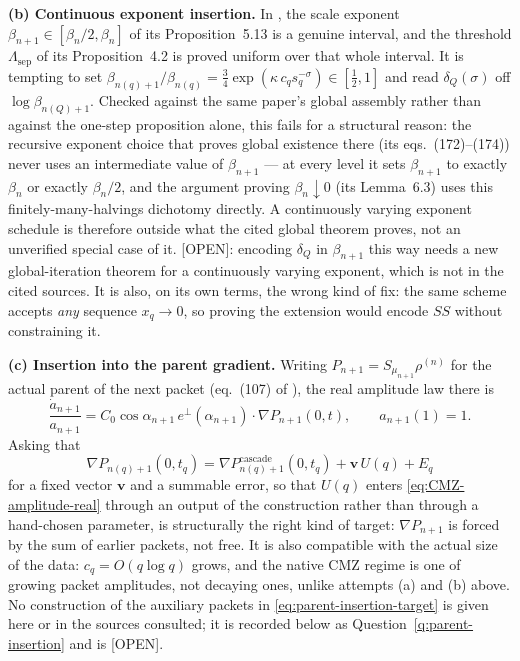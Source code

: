 \documentclass[11pt]{amsart}
\numberwithin{equation}{section}
\theoremstyle{plain}
\theoremstyle{definition}
\theoremstyle{remark}
\begin{document}
\textbf{(b) Continuous exponent insertion.}  In
\cite{AlpogeBuckmasterCoiculescu2026}, the scale exponent
$\beta_{n+1}\in[\beta_n/2,\beta_n]$ of its Proposition~5.13 is a genuine
interval, and the threshold $\Lambda_{\mathrm{sep}}$ of its Proposition~4.2
is proved uniform over that whole interval.  It is tempting to set
$\beta_{n(q)+1}/\beta_{n(q)}=\tfrac34\exp(\kappa\, c_qs_q^{-\sigma})\in[\tfrac12,1]$
and read $\delta_Q(\sigma)$ off $\log\beta_{n(Q)+1}$.  Checked against the
same paper's global assembly rather than against the one-step proposition
alone, this fails for a structural reason: the recursive exponent choice
that proves global existence there (its eqs.~(172)--(174)) never uses an
intermediate value of $\beta_{n+1}$ --- at every level it sets $\beta_{n+1}$
to exactly $\beta_n$ or exactly $\beta_n/2$, and the argument proving
$\beta_n\downarrow0$ (its Lemma~6.3) uses this finitely-many-halvings
dichotomy directly.  A continuously varying exponent schedule is therefore
outside what the cited global theorem proves, not an unverified special case
of it.  \textup{[OPEN]}: encoding $\delta_Q$ in $\beta_{n+1}$ this way needs
a new global-iteration theorem for a continuously varying exponent, which is
not in the cited sources.  It is also, on its own terms, the wrong kind of
fix: the same scheme accepts \emph{any} sequence $x_q\to0$, so proving the
extension would encode $SS$ without constraining it.

\textbf{(c) Insertion into the parent gradient.}  Writing
$P_{n+1}=S_{\mu_{n+1}}\rho^{(n)}$ for the actual parent of the next packet
(eq.~(107) of \cite{AlpogeBuckmasterCoiculescu2026}), the real amplitude law
there is
\begin{equation}
\frac{\dot a_{n+1}}{a_{n+1}}
=C_0\cos\alpha_{n+1}\,e^\perp(\alpha_{n+1})\cdot\nabla P_{n+1}(0,t),
\qquad a_{n+1}(1)=1.
\label{eq:CMZ-amplitude-real}
\end{equation}
Asking that
\begin{equation}
\nabla P_{n(q)+1}(0,t_q)
=\nabla P^{\mathrm{cascade}}_{n(q)+1}(0,t_q)+\mathbf v\,U(q)+E_q
\label{eq:parent-insertion-target}
\end{equation}
for a fixed vector $\mathbf v$ and a summable error, so that $U(q)$ enters
\eqref{eq:CMZ-amplitude-real} through an output of the construction rather
than through a hand-chosen parameter, is structurally the right kind of
target: $\nabla P_{n+1}$ is forced by the sum of earlier packets, not free.
It is also compatible with the actual size of the data: $c_q=O(q\log q)$
grows, and the native CMZ regime is one of growing packet amplitudes, not
decaying ones, unlike attempts (a) and (b) above.  No construction of the
auxiliary packets in \eqref{eq:parent-insertion-target} is given here or in
the sources consulted; it is recorded below as
Question~\ref{q:parent-insertion} and is \textup{[OPEN]}.
\end{document}
